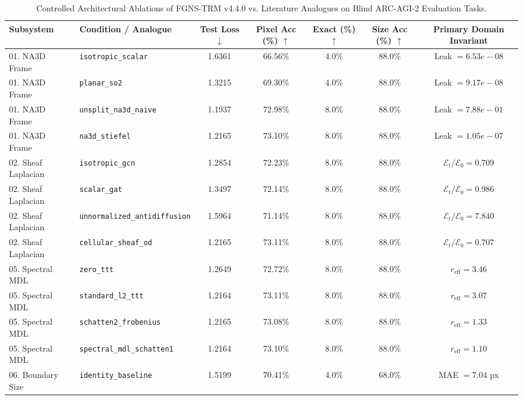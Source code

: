 \begin{table}[t]
\centering
\small
\caption{Controlled Architectural Ablations of FGNS-TRM v4.4.0 vs. Literature Analogues on Blind ARC-AGI-2 Evaluation Tasks.}
\label{tab:fgns_ablations}
\begin{tabular}{llccccc}
\toprule
\textbf{Subsystem} & \textbf{Condition / Analogue} & \textbf{Test Loss $\downarrow$} & \textbf{Pixel Acc (\%) $\uparrow$} & \textbf{Exact (\%) $\uparrow$} & \textbf{Size Acc (\%) $\uparrow$} & \textbf{Primary Domain Invariant} \\
\midrule
01. NA3D Frame & \texttt{isotropic\_scalar} & 1.6361 & 66.56\% & 4.0\% & 88.0\% & Leak $=6.53e-08$ \\
01. NA3D Frame & \texttt{planar\_so2} & 1.3215 & 69.30\% & 4.0\% & 88.0\% & Leak $=9.17e-08$ \\
01. NA3D Frame & \texttt{unsplit\_na3d\_naive} & 1.1937 & 72.98\% & 8.0\% & 88.0\% & Leak $=7.88e-01$ \\
01. NA3D Frame & \texttt{na3d\_stiefel} & 1.2165 & 73.10\% & 8.0\% & 88.0\% & Leak $=1.05e-07$ \\
\midrule
02. Sheaf Laplacian & \texttt{isotropic\_gcn} & 1.2854 & 72.23\% & 8.0\% & 88.0\% & $\mathcal{E}_t/\mathcal{E}_0=0.709$ \\
02. Sheaf Laplacian & \texttt{scalar\_gat} & 1.3497 & 72.14\% & 8.0\% & 88.0\% & $\mathcal{E}_t/\mathcal{E}_0=0.986$ \\
02. Sheaf Laplacian & \texttt{unnormalized\_antidiffusion} & 1.5964 & 71.14\% & 8.0\% & 88.0\% & $\mathcal{E}_t/\mathcal{E}_0=7.840$ \\
02. Sheaf Laplacian & \texttt{cellular\_sheaf\_od} & 1.2165 & 73.11\% & 8.0\% & 88.0\% & $\mathcal{E}_t/\mathcal{E}_0=0.707$ \\
\midrule
05. Spectral MDL & \texttt{zero\_ttt} & 1.2649 & 72.72\% & 8.0\% & 88.0\% & $r_{\text{eff}}=3.46$ \\
05. Spectral MDL & \texttt{standard\_l2\_ttt} & 1.2164 & 73.11\% & 8.0\% & 88.0\% & $r_{\text{eff}}=3.07$ \\
05. Spectral MDL & \texttt{schatten2\_frobenius} & 1.2165 & 73.08\% & 8.0\% & 88.0\% & $r_{\text{eff}}=1.33$ \\
05. Spectral MDL & \texttt{spectral\_mdl\_schatten1} & 1.2164 & 73.10\% & 8.0\% & 88.0\% & $r_{\text{eff}}=1.10$ \\
\midrule
06. Boundary Size & \texttt{identity\_baseline} & 1.5199 & 70.41\% & 4.0\% & 68.0\% & MAE $=7.04$ px \\

\end{tabular}
\end{table}
